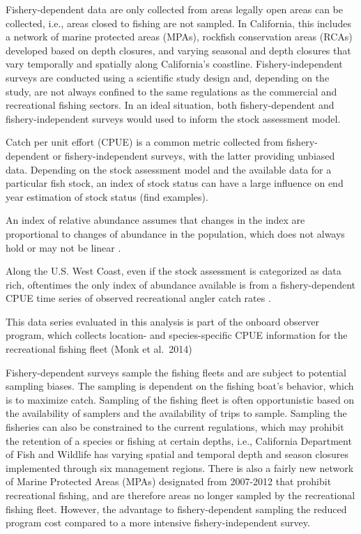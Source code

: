 \documentclass[preprint, 3p,
authoryear]{elsarticle} %
\begin{document}
Fishery-dependent data are only collected from areas legally open areas
can be collected, i.e., areas closed to fishing are not sampled. In
California, this includes a network of marine protected areas (MPAs),
rockfish conservation areas (RCAs) developed based on depth closures,
and varying seasonal and depth closures that vary temporally and
spatially along California's coastline. Fishery-independent surveys are
conducted using a scientific study design and, depending on the study,
are not always confined to the same regulations as the commercial and
recreational fishing sectors. In an ideal situation, both
fishery-dependent and fishery-independent surveys would used to inform
the stock assessment model.

Catch per unit effort (CPUE) is a common metric collected from
fishery-dependent or fishery-independent surveys, with the latter
providing unbiased data. Depending on the stock assessment model and the
available data for a particular fish stock, an index of stock status can
have a large influence on end year estimation of stock status (find
examples).

An index of relative abundance assumes that changes in the index are
proportional to changes of abundance in the population, which does not
always hold or may not be linear \citep{Harley2001}.

Along the U.S. West Coast, even if the stock assessment is categorized
as data rich, oftentimes the only index of abundance available is from a
fishery-dependent CPUE time series of observed recreational angler catch
rates \citep{Cope2013}.

This data series evaluated in this analysis is part of the onboard
observer program, which collects location- and species-specific CPUE
information for the recreational fishing fleet (Monk et al.~2014)

Fishery-dependent surveys sample the fishing fleets and are subject to
potential sampling biases. The sampling is dependent on the fishing
boat's behavior, which is to maximize catch. Sampling of the fishing
fleet is often opportunistic based on the availability of samplers and
the availability of trips to sample. Sampling the fisheries can also be
constrained to the current regulations, which may prohibit the retention
of a species or fishing at certain depths, i.e., California Department
of Fish and Wildlife has varying spatial and temporal depth and season
closures implemented through six management regions. There is also a
fairly new network of Marine Protected Areas (MPAs) designated from
2007-2012 that prohibit recreational fishing, and are therefore areas no
longer sampled by the recreational fishing fleet. However, the advantage
to fishery-dependent sampling the reduced program cost compared to a
more intensive fishery-independent survey.
\end{document}
